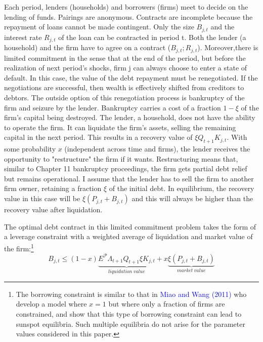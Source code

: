 \documentclass[cn,10pt,math=newtx,citestyle=gb7714-2015,bibstyle=gb7714-2015]{elegantbook}
\begin{document}
{{			Each period, lenders (households) and borrowers (firms) meet to decide on the lending of funds. Pairings are anonymous. Contracts are incomplete because the repayment of loans cannot be made contingent. Only the size $B_{j,t}$ and the interest rate $R_{j,t}$ of the loan can be contracted in period t. Both the lender (a household) and the firm have to agree on a contract ($B_{j,t};R_{j,t}$). Moreover,there is limited commitment in the sense that at the end of the period, but before the realization of next period's shocks, firm j can always choose to enter a state of default. In this case, the value of the debt repayment must be renegotiated. If the negotiations are successful, then wealth is effectively shifted from creditors to debtors. The outside option of this renegotiation process is bankruptcy of the firm and seizure by the lender. Bankruptcy carries a cost of a fraction $1-\xi$ of the firm's capital being destroyed. The lender, a household, does not have the ability to operate the firm. It can liquidate the firm's assets, selling the remaining capital in the next period. This results in a recovery value of $\xi Q_{t+1}K_{j,t}$. With some probability $x$ (independent across time and firms), the lender receives the opportunity to "restructure" the firm if it wants. Restructuring means that, similar to Chapter 11 bankruptcy proceedings, the firm gets partial debt relief but remains operational. I assume that the lender has to sell the firm to another firm owner, retaining a fraction $\xi$ of the initial debt. In equilibrium, the recovery value in this case will be $\xi (P_{j,t} + B_{j,t})$
			and this will always be higher than the recovery value after liquidation.
			
			The optimal debt contract in this limited commitment problem takes the form of a leverage constraint with a weighted average of liquidation and market value of
			the firm:\footnote{The borrowing constraint is similar to that in \textcolor{blue}{Miao and Wang (2011)} who develop a model where $x = 1$ but where only a fraction of firms are constrained, and show that this type of borrowing constraint can lead to sunspot equilibria. Such multiple equilibria do not arise for the parameter values considered in this paper.}
			\begin{equation}
				B_{j,t} \le (1 - x) \underbrace{\mathit{E}^{\mathcal{P}}\Lambda_{t+1}{Q_{t+1}\xi K_{j,t}}}_{liquidation ~value}+x \underbrace{\xi (P_{j,t} + B_{j,t})}_{market~ value}
			\end{equation}
			
}}
\end{document}
